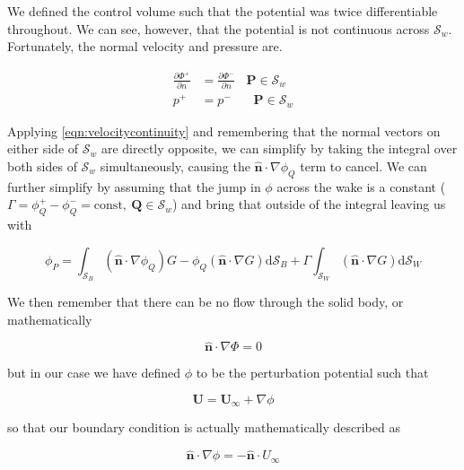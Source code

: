 	We defined the control volume such that the potential was twice differentiable throughout. We can see, however, that the potential is not continuous across \( \mathcal{S}_w \). Fortunately, the normal velocity and pressure are.
	
	\begin{align}
	\label{eqn:velocitycontinuity}
	\frac{\partial \Phi^+}{\partial n} &= \frac{\partial \Phi^-}{\partial n}~~~~\mathbf{P} \in \mathcal{S}_w\\
	p^+ &= p^-~~~~~~~~\mathbf{P} \in \mathcal{S}_w
	\end{align}
	
	Applying \cref{eqn:velocitycontinuity} and remembering that the normal vectors on either side of \( \mathcal{S}_w \) are directly opposite, we can simplify by taking the integral over both sides of \( \mathcal{S}_w \) simultaneously, causing the \(\mathbf{\hat{n}} \cdot \nabla \phi_Q\) term to cancel.  We can further simplify by assuming that the jump in $\phi$ across the wake is a constant (\( \Gamma = \phi^+_Q - \phi^-_Q = \mathrm{const}, ~\mathbf{Q} \in \mathcal{S}_w \)) and bring that outside of the integral leaving us with
	
	\begin{equation}
	\phi_P = \int_{\mathcal{S}_B} \left( \mathbf{\hat{n}} \cdot \nabla \phi_Q \right) G - \phi_Q \left( \mathbf{\hat{n}} \cdot \nabla G \right) \mathrm{d} \mathcal{S}_B + \Gamma \int_{\mathcal{S}_W} \left( \mathbf{\hat{n}} \cdot \nabla G \right) \mathrm{d} \mathcal{S}_W
	\end{equation}
	
	We then remember that there can be no flow through the solid body, or mathematically
	
	\begin{equation}
	\mathbf{\hat{n}} \cdot \nabla \Phi = 0
	\end{equation}
	
	\noindent but in our case we have defined $\phi$ to be the perturbation potential such that
	
	\begin{equation}
	\mathbf{U} = \mathbf{U_\infty} + \nabla \phi
	\end{equation}
	
	\noindent so that our boundary condition is actually mathematically described as
	
	\begin{equation}
	\mathbf{\hat{n}} \cdot \nabla \phi = -\mathbf{\hat{n}} \cdot U_{\infty}
	\end{equation}
	
